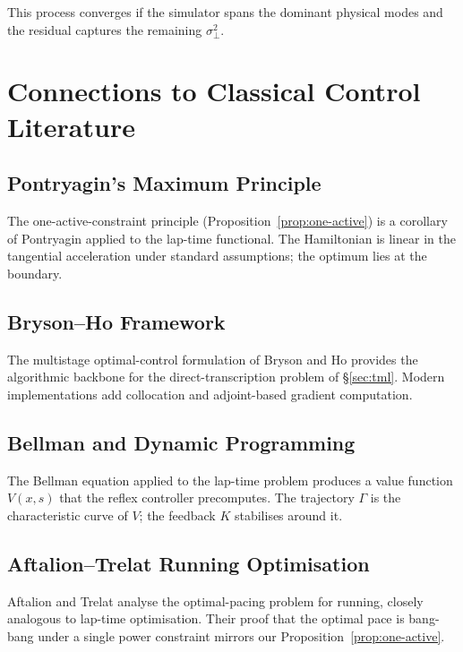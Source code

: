 \documentclass[11pt,twocolumn]{article}
\theoremstyle{definition}
\theoremstyle{remark}
\begin{document}
This process converges if the simulator spans the dominant physical modes and the residual captures the remaining $\sigma^2_{\perp}$.

\section{Connections to Classical Control Literature}
\label{app:classical}

\subsection{Pontryagin's Maximum Principle}

The one-active-constraint principle (Proposition~\ref{prop:one-active}) is a corollary of Pontryagin \cite{pontryagin1962mathematical} applied to the lap-time functional. The Hamiltonian is linear in the tangential acceleration under standard assumptions; the optimum lies at the boundary.

\subsection{Bryson--Ho Framework}

The multistage optimal-control formulation of Bryson and Ho \cite{bryson1975applied} provides the algorithmic backbone for the direct-transcription problem of \S\ref{sec:tml}. Modern implementations add collocation and adjoint-based gradient computation.

\subsection{Bellman and Dynamic Programming}

The Bellman equation \cite{bertsekas2012dynamic} applied to the lap-time problem produces a value function $V(x, s)$ that the reflex controller precomputes. The trajectory $\Gamma$ is the characteristic curve of $V$; the feedback $K$ stabilises around it.

\subsection{Aftalion--Trelat Running Optimisation}

Aftalion and Trelat \cite{aftalion2014train} analyse the optimal-pacing problem for running, closely analogous to lap-time optimisation. Their proof that the optimal pace is bang-bang under a single power constraint mirrors our Proposition~\ref{prop:one-active}.
\end{document}
